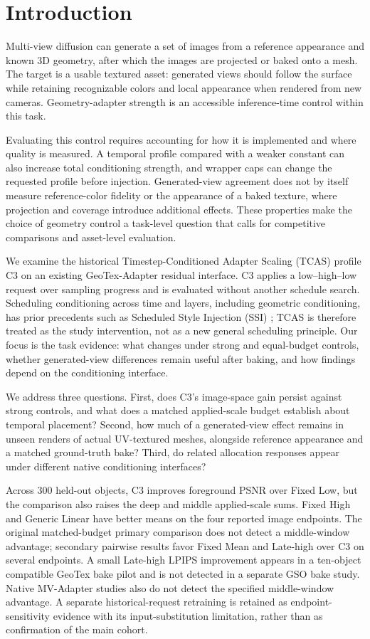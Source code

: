 \documentclass[times,twocolumn,final]{elsarticle}
\begin{document}
\section{Introduction}
\label{sec:intro}

Multi-view diffusion can generate a set of images from a reference appearance and known 3D geometry, after which the images are projected or baked onto a mesh. The target is a usable textured asset: generated views should follow the surface while retaining recognizable colors and local appearance when rendered from new cameras. Geometry-adapter strength is an accessible inference-time control within this task.

Evaluating this control requires accounting for how it is implemented and where quality is measured. A temporal profile compared with a weaker constant can also increase total conditioning strength, and wrapper caps can change the requested profile before injection. Generated-view agreement does not by itself measure reference-color fidelity or the appearance of a baked texture, where projection and coverage introduce additional effects. These properties make the choice of geometry control a task-level question that calls for competitive comparisons and asset-level evaluation.

We examine the historical Timestep-Conditioned Adapter Scaling (TCAS) profile C3 on an existing GeoTex-Adapter residual interface. C3 applies a low--high--low request over sampling progress and is evaluated without another schedule search. Scheduling conditioning across time and layers, including geometric conditioning, has prior precedents such as Scheduled Style Injection (SSI) \cite{kulkarni2026ssi}; TCAS is therefore treated as the study intervention, not as a new general scheduling principle. Our focus is the task evidence: what changes under strong and equal-budget controls, whether generated-view differences remain useful after baking, and how findings depend on the conditioning interface.

We address three questions. First, does C3's image-space gain persist against strong controls, and what does a matched applied-scale budget establish about temporal placement? Second, how much of a generated-view effect remains in unseen renders of actual UV-textured meshes, alongside reference appearance and a matched ground-truth bake? Third, do related allocation responses appear under different native conditioning interfaces?

Across 300 held-out objects, C3 improves foreground PSNR over Fixed Low, but the comparison also raises the deep and middle applied-scale sums. Fixed High and Generic Linear have better means on the four reported image endpoints. The original matched-budget primary comparison does not detect a middle-window advantage; secondary pairwise results favor Fixed Mean and Late-high over C3 on several endpoints. A small Late-high LPIPS improvement appears in a ten-object compatible GeoTex bake pilot and is not detected in a separate GSO bake study. Native MV-Adapter studies also do not detect the specified middle-window advantage. A separate historical-request retraining is retained as endpoint-sensitivity evidence with its input-substitution limitation, rather than as confirmation of the main cohort.
\end{document}
